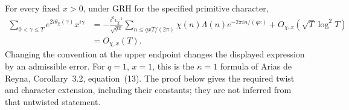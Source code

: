 \begin{lemma}\label{lem:A037-twist}
For every fixed $x>0$, under GRH for the specified primitive character,
\begin{align}\label{eq:A037-twist}
 \sum_{0<\gamma\le T}e^{2i\theta_\chi(\gamma)}x^{i\gamma}
 &=-\frac{i^a\epsilon_\chi^{-1}}{\sqrt{qx}}
    \sum_{n\le qxT/(2\pi)}\chi(n)\Lambda(n)e^{-2\pi i n/(qx)}
    +O_{\chi,x}(\sqrt T\log^2 T)\\
 &=O_{\chi,x}(T).\nonumber
\end{align}
Changing the convention at the upper endpoint changes the displayed
expression by an admissible error. For $q=1$, $x=1$, this is the
$\kappa=1$ formula of Arias de Reyna, Corollary~3.2, equation~(13).
The proof below gives the required twist and character extension,
including their constants; they are not inferred from that untwisted
statement.
\end{lemma}

